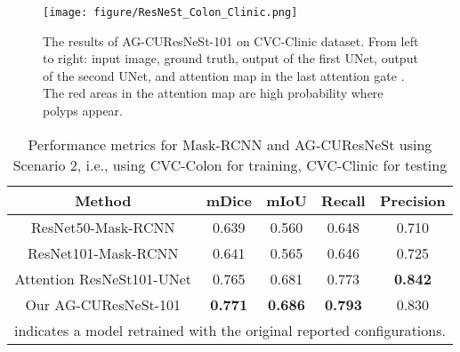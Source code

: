 \documentclass[review, sort&compress]{elsarticle}
\begin{document}
	\begin{figure*}[ht!]
		\centering
		\texttt{[image: figure/ResNeSt\_Colon\_Clinic.png]}
		\caption{The results of AG-CUResNeSt-101 on CVC-Clinic dataset. From left to right: input image, ground truth, output of the first UNet, output of the second UNet, and attention map in the last attention gate . The red areas in the attention map are high probability where polyps appear.}
		\label{fig_compare_two_UNets}
	\end{figure*}
	
	\begin{table}[ht!]
		\centering
		\caption{Performance metrics for Mask-RCNN and AG-CUResNeSt using Scenario 2, i.e., using CVC-Colon for training, CVC-Clinic for testing}
		\begin{tabular}{ c|c c c c}
			\hline
			Method & mDice  & mIoU  & Recall  & Precision   \\
			\hline
			\hline
			ResNet50-Mask-RCNN \cite{qadir2019polyp}   & 0.639    & 0.560        & 0.648  & 0.710      \\
			
			ResNet101-Mask-RCNN \cite{qadir2019polyp}  & 0.641 & 0.565        & 0.646  & 0.725      \\
			\hline
			\hline
			Attention ResNeSt101-UNet    & 0.765    & 0.681        & 0.773  & \textbf{0.842}      \\
			Our AG-CUResNeSt-101    & \textbf{0.771}    & \textbf{0.686}        & \textbf{0.793}  & 0.830      \\
			\hline
			\multicolumn{5}{l}{ indicates a model retrained with the original reported configurations.
			}
			
		\end{tabular}
		\label{tab_colon_clinic}
	\end{table}
	
\end{document}
